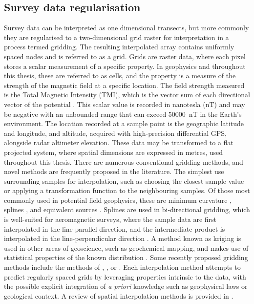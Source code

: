 \subsection{Survey data regularisation}
\label{sec:introgrids}
Survey data can be interpreted as one dimensional transects, but more commonly they are regularised to a two-dimensional grid raster for interpretation in a process termed gridding.
The resulting interpolated array contains uniformly spaced nodes and is referred to as a grid.
Grids are raster data, where each pixel stores a scalar measurement of a specific property.
In geophysics and throughout this thesis, these are referred to as cells, and the property is a measure of the strength of the magnetic field at a specific location.
The field strength measured is the Total Magnetic Intensity (TMI), which is the vector sum of each directional vector of the potential \parencite{blakelyPotentialTheoryGravity1996}.
This scalar value is recorded in nanotesla (nT) and may be negative with an unbounded range that can exceed \qty{50000}{\nano\tesla} in the Earth's environment.
The location recorded at a sample point is the geographic latitude and longitude, and altitude, acquired with high-precision differential GPS, alongside radar altimeter elevation.
These data may be transformed to a flat projected system, where spatial dimensions are expressed in metres, used throughout this thesis.
There are numerous conventional gridding methods, and novel methods are frequently proposed in the literature.
The simplest use surrounding samples for interpolation, such as choosing the closest sample value or applying a transformation function to the neighbouring samples.
Of those most commonly used in potential field geophysics, these are minimum curvature \parencite{briggsMachineContouringUsing1974}, splines \parencite{bhattacharyyaBicubicSplineInterpolation1969,shureHarmonicSplinesGeomagnetic1982,smithGriddingContinuousCurvature1990}, and equivalent sources \parencite{dampneyEquivalentSourceTechnique1969, solerBetterStrategyInterpolating2020}.
Splines are used in bi-directional gridding, which is well-suited for aeromagnetic surveys, where the sample data are first interpolated in the line parallel direction, and the intermediate product is interpolated in the line-perpendicular direction \parencite{dentithGeophysicsMineralExploration2014}.
A method known as kriging is used in other areas of geoscience, such as geochemical mapping, and makes use of statistical properties of the known distribution \parencite{hansenInterpretiveGriddingAnisotropic1993,davis1986statistics}.
Some recently proposed gridding methods include the methods of \textcite{naprstekNewMethodInterpolating2019}, \textcite{xuGravityAnomalyReconstruction2019}, or \textcite{chenPotentialFieldData2022}.
Each interpolation method attempts to predict regularly spaced grids by leveraging properties intrinsic to the data, with the possible explicit integration of \emph{a priori} knowledge such as geophysical laws or geological context.
A review of spatial interpolation methods is provided in \textcite{liReviewComparativeStudies2011}.

